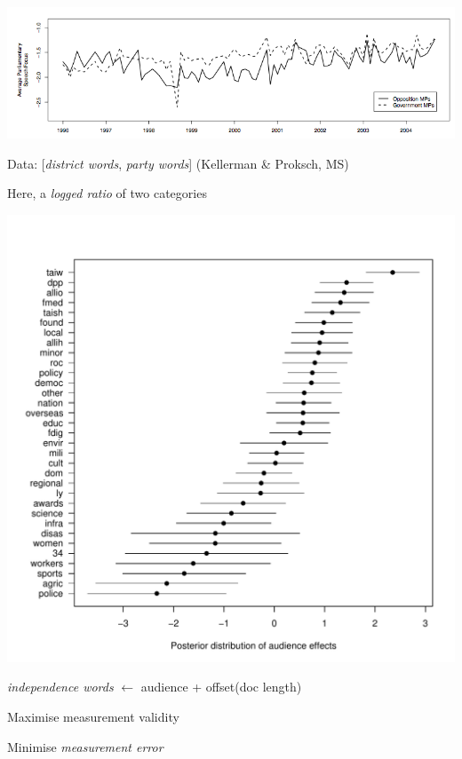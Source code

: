 \documentclass{mediumfoils}
\begin{document}
~\\
\centerline{\includegraphics[scale=.8]{pictures/district-party-focus}}

Data: [\textsl{district words}, \textsl{party words}] (Kellerman \& Proksch, MS)

Here, a \textit{logged ratio} of two categories


\centerline{\includegraphics[scale=.5]{pictures/indep-ref}}

\textsl{independence words} $\leftarrow$ audience + offset(doc length)



Maximise measurement validity

Minimise \textsl{measurement error}
\end{document}
